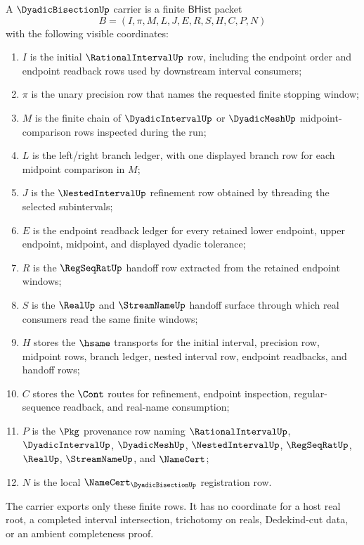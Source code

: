 \begin{definition}
\label{def:dyadic-bisection-carrier}
A $\DyadicBisectionUp$ carrier is a finite $\mathsf{BHist}$ packet
$$
B=(I,\pi,M,L,J,E,R,S,H,C,P,N)
$$
with the following visible coordinates:
\begin{enumerate}
\item $I$ is the initial $\RationalIntervalUp$ row, including the endpoint order and endpoint readback rows used by downstream interval consumers;
\item $\pi$ is the unary precision row that names the requested finite stopping window;
\item $M$ is the finite chain of $\DyadicIntervalUp$ or $\DyadicMeshUp$ midpoint-comparison rows inspected during the run;
\item $L$ is the left/right branch ledger, with one displayed branch row for each midpoint comparison in $M$;
\item $J$ is the $\NestedIntervalUp$ refinement row obtained by threading the selected subintervals;
\item $E$ is the endpoint readback ledger for every retained lower endpoint, upper endpoint, midpoint, and displayed dyadic tolerance;
\item $R$ is the $\RegSeqRatUp$ handoff row extracted from the retained endpoint windows;
\item $S$ is the $\RealUp$ and $\StreamNameUp$ handoff surface through which real consumers read the same finite windows;
\item $H$ stores the $\hsame$ transports for the initial interval, precision row, midpoint rows, branch ledger, nested interval row, endpoint readbacks, and handoff rows;
\item $C$ stores the $\Cont$ routes for refinement, endpoint inspection, regular-sequence readback, and real-name consumption;
\item $P$ is the $\Pkg$ provenance row naming $\RationalIntervalUp$, $\DyadicIntervalUp$, $\DyadicMeshUp$, $\NestedIntervalUp$, $\RegSeqRatUp$, $\RealUp$, $\StreamNameUp$, and $\NameCert$;
\item $N$ is the local $\NameCert_{\DyadicBisectionUp}$ registration row.
\end{enumerate}
The carrier exports only these finite rows. It has no coordinate for a host real root, a completed interval intersection, trichotomy on reals, Dedekind-cut data, or an ambient completeness proof.
\end{definition}

